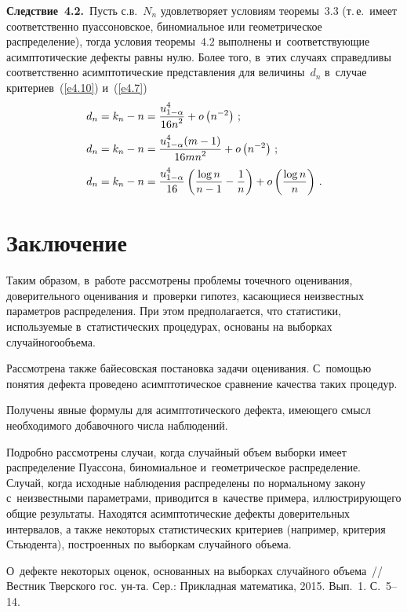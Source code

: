 \begin{multicols}{2}
\noindent
\textbf{Следствие~4.2.}\ {Пусть с.в.~$N_n$ удовлетворяет 
условиям теоремы~$3.3$ (т.\,е.\ имеет соответственно пуассоновское, биномиальное 
или гео\-мет\-ри\-че\-ское распреде\-ле\-ние), тогда условия теоремы~$4.2$ выполнены и~соответствующие 
асимптотические дефекты равны нулю. Более того, в~этих случаях справедливы 
соответственно асимптотические представления для величины~$d_n$ 
в~случае критериев}~(\ref{e4.10}) {и}~(\ref{e4.7})
\begin{align*}
d_n& = k_n - n = \displaystyle\frac{\displaystyle u^4_{1-\alpha}\mathstrut}{\displaystyle 16n^2\mathstrut} + o\left(n^{-2}\right)\,;
\\
d_n &= k_n - n = \displaystyle\frac{\displaystyle u^4_{1-\alpha}(m-1)\mathstrut}{\displaystyle 16mn^2\mathstrut} +
o \left(n^{-2}\right)\,;
\\
d_n &= k_n - n = \displaystyle\frac{\displaystyle u^4_{1-\alpha}\mathstrut}{\displaystyle 16\mathstrut}\left(\displaystyle\frac{\displaystyle \log n\mathstrut}{\displaystyle n - 1\mathstrut} - 
\displaystyle\frac{\displaystyle 1\mathstrut}{\displaystyle n\mathstrut}\right) +  o\left(\displaystyle\frac{\displaystyle \log n\mathstrut}{\displaystyle n\mathstrut}\right)\,.
\end{align*}


\section{Заключение}

Таким образом, в~работе рассмотрены проблемы точечного оценивания, 
доверительного оценивания и~проверки гипотез, касающиеся неизвестных\linebreak 
параметров распределения. При этом предполага\-ется, что статистики, 
используемые в~статистиче\-ских процедурах, основаны на выборках случайного\linebreak объема. 

Рассмотрена также байесовская постановка задачи оценивания. 
С~по\-мощью понятия дефекта проведено асимптотическое сравнение качества таких 
процедур. 

Получены явные формулы для асимптотического дефекта, имеющего смысл
необходимого добавочного числа наблюдений. 

Подроб\-но рассмотрены случаи, когда 
случайный объем выборки имеет распределение Пуассона, биномиальное и~геометрическое 
распределение. Случай, когда исходные наблюдения распределены по нормальному 
закону с~неизвестными параметрами, приводится в~качестве примера, иллюстрирующего 
общие результаты. Находятся асимптотические дефекты доверительных интервалов, а также 
некоторых статистических критериев (например, критерия Стьюдента), построенных по 
выборкам случайного объема.

{\small\frenchspacing
 {%
 \begin{thebibliography}{9}
 О~дефекте некоторых оценок, основанных на выборках случайного
объема~// Вестник Тверского гос. ун-та. Сер.:
Прикладная математика, 2015. Вып.~1. С.~5--14.


\end{thebibliography}}}
\end{multicols}
